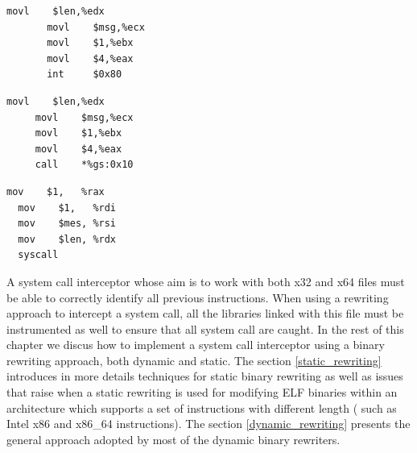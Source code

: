 \begin{multicols}{3}

\begin{center}
\lstset{escapechar=@,style=asm}
\begin{lstlisting}[caption={Write system via interrupt, x32}]
       movl    $len,%edx       
       movl    $msg,%ecx       
       movl    $1,%ebx        
       movl    $4,%eax         
       int 	   $0x80
\end{lstlisting}
\end{center}

\begin{center}
\lstset{escapechar=@,style=asm}
\begin{lstlisting}[caption={Write system call via VSDO, note the offset in the segment might change in a different platform, x32}]
     movl    $len,%edx       
     movl    $msg,%ecx       
     movl    $1,%ebx        
     movl    $4,%eax         
     call    *%gs:0x10
\end{lstlisting}
\end{center}

\begin{center}
\lstset{escapechar=@,style=asm}
\begin{lstlisting}[caption={Write system call via systcall, x64}]
  mov    $1,   %rax          
  mov    $1,   %rdi         
  mov    $mes, %rsi     
  mov    $len, %rdx      
  syscall

\end{lstlisting}
\end{center}

\end{multicols}


A system call interceptor whose aim is to work with both x32 and x64 files must be able to correctly identify all previous instructions. When using a rewriting approach to intercept a system call, all the libraries linked with this file must be instrumented as well to ensure that all system call are caught. In the rest of this chapter we discus how to implement a system call interceptor using a binary rewriting approach, both dynamic and static. The section \ref{static_rewriting} introduces in more details techniques for static binary rewriting as well as issues that raise when a static rewriting is used for modifying ELF binaries within an architecture which supports  a set of instructions with different length ( such as Intel x86 and x86\_64 instructions). The section \ref{dynamic_rewriting} presents the general approach adopted by most of the dynamic binary rewriters. 

